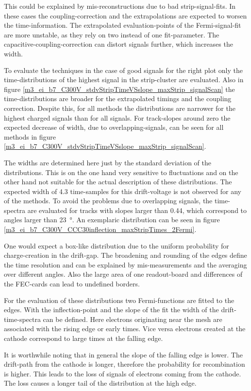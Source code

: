 \documentclass[
twoside,            %
BCOR1.4cm,          %
10pt,               %
headings=normal,    %
headsepline,        %
clearplainpage,		%
final,              %
div=14,
open=right,
bibliography=toc
]{scrreprt}
\begin{document}
This could be explained by mis-reconstructions due to bad strip-signal-fits.
In these cases the coupling-correction and the extrapolations are expected to worsen the time-information.
The extrapolated evaluation-points of the Fermi-signal-fit are more unstable, as they rely on two instead of one fit-parameter.
The capacitive-coupling-correction can distort signals further, which increases the width.

To evaluate the techniques in the case of good signals for the right plot only the time-distributions of the highest signal in the strip-cluster are evaluated.
Also in figure \ref{m3_ei_b7_C300V_stdvStripTimeVSslope_maxStrip_signalScan} the time-distributions are broader for the extrapolated timings and the coupling correction.
Despite this, for all methods the distributions are narrower for the highest charged signals than for all signals.
For track-slopes around zero the expected decrease of width, due to overlapping-signals, can be seen for all methods in figure \ref{m3_ei_b7_C300V_stdvStripTimeVSslope_maxStrip_signalScan}.

The widths are determined here just by the standard deviation of the distributions.
This is on the one hand very sensitive to fluctuations and on the other hand not suitable for the actual description of these distributions.
The expected width of 4.3 time-samples for this drift-voltage is not observed for any of the methods.
To avoid the problems due to overlapping signals, the time-spectra are evaluated for tracks with slopes larger than 0.44, which correspond to angles larger than \SI{23}{\degree}.
An exemplaric distribution can be seen in figure \ref{m3_ei_b7_C300V_CCC30inflection_maxStripTimes_2Fermi}.

One would expect a box-like distribution due to the uniform probability for charge-creation in the drift-gap.
The broadening and rounding of the edges define the time resolution and can be explained by mis-measurements and the averaging over different angles.
Also the large area of one readout-board and differences of the FEC-cards can lead to undefined borders.

For the evaluation of these distributions two Fermi-functions are fitted to the edges.
With the inflection-point and the slope of the fit the width of the drift-time-spectra can be defined.
Here electrons originating near the mesh are associated with the rising edge or early times.
Vice versa electrons created at the cathode correspond to large times at the falling edge.

It is worthwhile noting that in general the slope of the falling edge is lower. 
The drift-path from the cathode is longer, therefore the probability for recombination is higher.
This leads to the loss of signals of electrons coming from the cathode.
The loss causes a longer tail of the distribution at the high edge.
\end{document}
